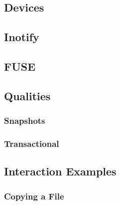
\subsection{Devices}



\subsection{Inotify}



\subsection{FUSE}

\subsection{Qualities}

\subsubsection{Snapshots}

\subsubsection{Transactional}

\subsection{Interaction Examples}

\subsubsection{Copying a File}

